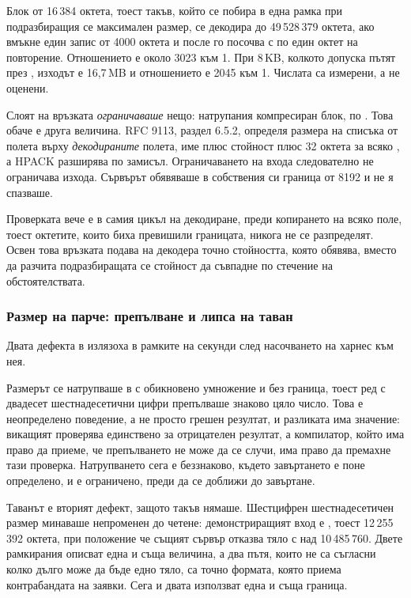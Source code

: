 Блок от 16\,384 октета, тоест такъв, който се побира в една рамка  при
подразбиращия се максимален размер, се декодира до 49\,528\,379 октета, ако вмъкне един
запис от 4000 октета и после го посочва с по един октет на повторение. Отношението е около
3023 към 1. При 8\,KB, колкото допуска пътят през , изходът е 16,7\,MB и
отношението е 2045 към 1. Числата са измерени, а не оценени.

Слоят на връзката \emph{ограничаваше} нещо: натрупания компресиран блок, по
. Това обаче е друга величина. RFC 9113, раздел 6.5.2, определя
размера на списъка от полета върху \emph{декодираните} полета, име плюс стойност плюс 32
октета за всяко \cite{rfc9113}, а HPACK разширява по замисъл. Ограничаването на входа
следователно не ограничава изхода. Сървърът обявяваше в собствения си  граница
от 8192 и не я спазваше.

Проверката вече е в самия цикъл на декодиране, преди копирането на всяко поле, тоест
октетите, които биха превишили границата, никога не се разпределят. Освен това връзката
подава на декодера точно стойността, която обявява, вместо да разчита подразбиращата се
стойност да съвпадне по стечение на обстоятелствата.

\subsubsection{Размер на парче: препълване и липса на таван}

Двата дефекта в  излязоха в рамките на секунди след насочването на
харнес към нея.

Размерът се натрупваше в  с обикновено умножение и без граница, тоест ред с
двадесет шестнадесетични цифри препълваше знаково цяло число. Това е неопределено поведение,
а не просто грешен резултат, и разликата има значение: викащият проверява единствено за
отрицателен резултат, а компилатор, който има право да приеме, че препълването не може да се
случи, има право да премахне тази проверка. Натрупването сега е беззнаково, където
завъртането е поне определено, и е ограничено, преди да се доближи до завъртане.

Таванът е вторият дефект, защото такъв нямаше. Шестцифрен шестнадесетичен размер минаваше
непроменен до четене: демонстриращият вход е , тоест 12\,255\,392 октета, при
положение че същият сървър отказва тяло с  над 10\,485\,760. Двете
рамкирания описват една и съща величина, а два пътя, които не са съгласни колко дълго може да
бъде едно тяло, са точно формата, която приема контрабандата на заявки. Сега и двата
използват една и съща граница.

